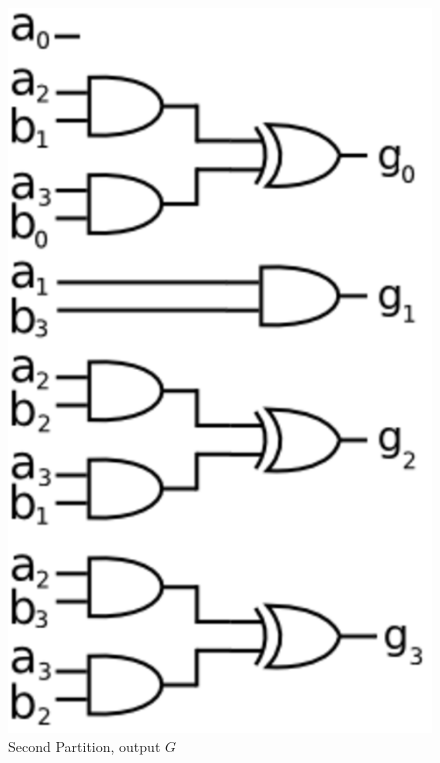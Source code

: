 \begin{Example}
\begin{figure}[H]
	\begin{center}
	\includegraphics[scale=0.8]{figures/part2.eps}
	\end{center}
	\caption{Second Partition, output $G$}
	\label{fig:part2}
\end{figure}


\end{Example}
